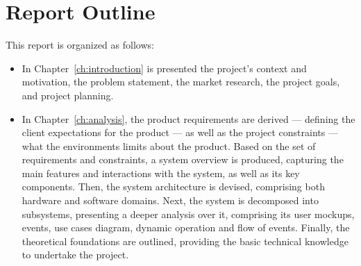 \section{Report Outline}%
\label{sec:report-outline}
This report is organized as follows:
\begin{itemize}
\item In Chapter~\ref{ch:introduction} is presented the project's context and
  motivation, the problem statement, the market research, the project goals, and
  project planning.
\item In Chapter~\ref{ch:analysis}, the product requirements are derived --- defining the client expectations
for the product --- as well as the project constraints --- what the environments
limits about the product. Based on the set of requirements and constraints, a
system overview is produced, capturing the main features and interactions with
the system, as well as its key components.
Then, the system architecture is
devised, comprising both hardware and software domains. Next, the system is
decomposed into subsystems, presenting a deeper analysis over it, comprising its
user mockups, events, use cases diagram, dynamic operation and flow of events.
Finally, the theoretical foundations are outlined, providing the basic technical knowledge to undertake the project.

\end{itemize}
